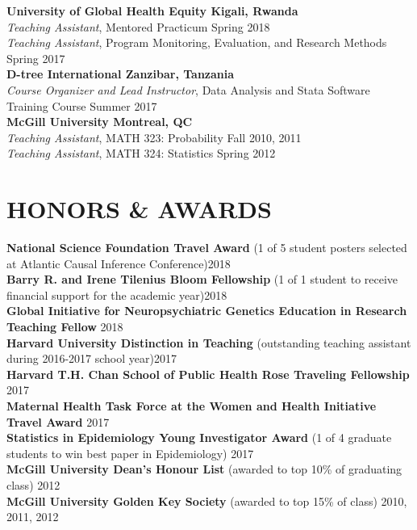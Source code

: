 \documentclass[12pt]{article}
\begin{document}
\textbf{University of Global Health Equity \hfill \hfill Kigali, Rwanda} \\
\textit{Teaching Assistant}, Mentored Practicum \hfill \hfill Spring 2018  \\
\textit{Teaching Assistant}, Program Monitoring, Evaluation, and Research Methods  \hfill \hfill Spring 2017 \\

\textbf{D-tree International \hfill \hfill Zanzibar, Tanzania}\\
\textit{Course Organizer and Lead Instructor}, Data Analysis and Stata Software Training Course \hfill \hfill Summer 2017  \\

\textbf{McGill University \hfill \hfill Montreal, QC}\\
\textit{Teaching Assistant}, MATH 323: Probability \hfill \hfill Fall 2010, 2011 \\
\textit{Teaching Assistant}, MATH 324: Statistics \hfill \hfill Spring 2012 

\section*{\textbf{{\large H}{ONORS} {\large \&} {\large A}{WARDS}}}
\textbf{National Science Foundation Travel Award} {\footnotesize (1 of 5 student posters selected at Atlantic Causal Inference Conference)}\hfill \hfill	2018 \\
\textbf{Barry R. and Irene Tilenius Bloom Fellowship} {\footnotesize (1 of 1 student to receive financial support for the academic year)}\hfill \hfill	2018 \\
\textbf{Global Initiative for Neuropsychiatric Genetics Education in Research Teaching Fellow} \hfill \hfill 2018 \\
\textbf{Harvard University Distinction in Teaching} {\footnotesize (outstanding teaching assistant during 2016-2017 school year)}\hfill \hfill	2017 \\
\textbf{Harvard T.H. Chan School of Public Health Rose Traveling Fellowship} \hfill \hfill	2017 \\
\textbf{Maternal Health Task Force at the Women and Health Initiative Travel Award} \hfill \hfill	2017 \\
\textbf{Statistics in Epidemiology Young Investigator Award} {\footnotesize (1 of 4 graduate students to win best paper in Epidemiology)}  \hfill \hfill	2017 \\
\textbf{McGill University Dean's Honour List} {\footnotesize (awarded to top 10\% of graduating class)}  \hfill \hfill	2012 \\
\textbf{McGill University Golden Key Society} {\footnotesize (awarded to top 15\% of class)}  \hfill \hfill2010, 2011, 2012 
\end{document}
